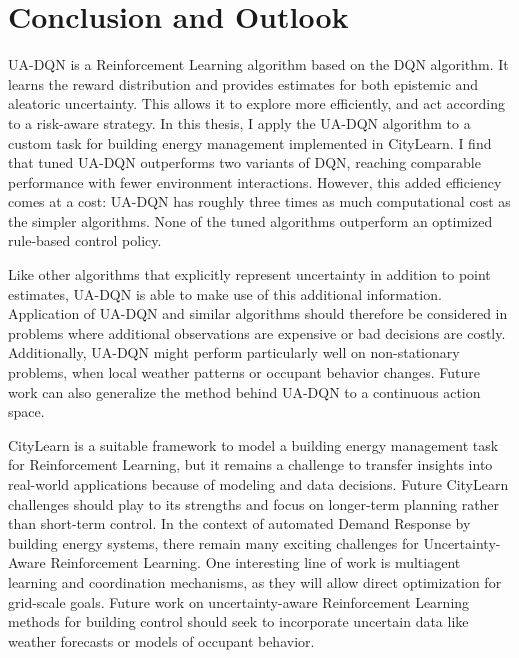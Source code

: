 
\chapter{Conclusion and Outlook}
  \label{conclusion}
UA-DQN is a Reinforcement Learning algorithm based on the DQN algorithm.
It learns the reward distribution and provides estimates for both epistemic and aleatoric uncertainty.
This allows it to explore more efficiently, and act according to a risk-aware strategy.
In this thesis, I apply the UA-DQN algorithm to a custom task for building energy management implemented in CityLearn.
I find that tuned UA-DQN outperforms two variants of DQN, reaching comparable performance with fewer environment interactions.
However, this added efficiency comes at a cost: UA-DQN has roughly three times as much computational cost as the simpler algorithms.
None of the tuned algorithms outperform an optimized rule-based control policy.

Like other algorithms that explicitly represent uncertainty in addition to point estimates, UA-DQN is able to make use of this additional information.
Application of UA-DQN and similar algorithms should therefore be considered in problems where additional observations are expensive or bad decisions are costly.
Additionally, UA-DQN might perform particularly well on non-stationary problems, when local weather patterns or occupant behavior changes.
Future work can also generalize the method behind UA-DQN to a continuous action space.

CityLearn is a suitable framework to model a building energy management task for Reinforcement Learning, but it remains a challenge to transfer insights into real-world applications because of modeling and data decisions.
Future CityLearn challenges should play to its strengths and focus on longer-term planning rather than short-term control.
In the context of automated Demand Response by building energy systems, there remain many exciting challenges for Uncertainty-Aware Reinforcement Learning.
One interesting line of work is multiagent learning and coordination mechanisms, as they will allow direct optimization for grid-scale goals.
Future work on uncertainty-aware Reinforcement Learning methods for building control should seek to incorporate uncertain data like weather forecasts or models of occupant behavior.